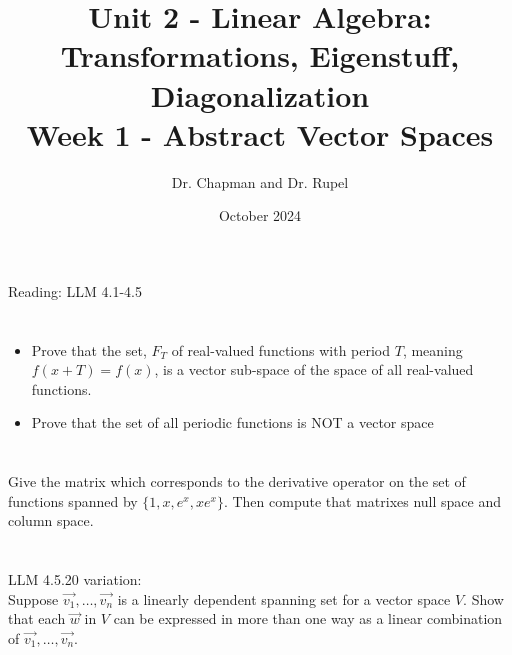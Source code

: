 \documentclass{article}
\title{Unit 2 - Linear Algebra: Transformations, Eigenstuff, Diagonalization \\ Week 1 - Abstract Vector Spaces}
\author{Dr. Chapman and Dr. Rupel}
\date{October 2024}
\begin{document}
\maketitle
Reading: LLM 4.1-4.5\\
\section{}
\begin{itemize}
    \item Prove that the set, $F_T$ of real-valued functions with period $T$, meaning $f(x+T) = f(x)$, is a vector sub-space of the space of all real-valued functions.
    \item Prove that the set of all periodic functions is NOT a vector space
\end{itemize}
\section{}
Give the matrix which corresponds to the derivative operator on the set of functions spanned by $\{1, x, e^x, xe^x\}$. Then compute that matrixes null space and column space.\\
\section{}
LLM 4.5.20 variation:\\
Suppose $\vec{v_1}, \ldots ,\vec{v_n}$ is a linearly dependent spanning set for a vector space $V$. Show that each $\vec{w}$ in $V$ can be expressed in more than one way as a linear combination of $\vec{v_1},\ldots, \vec{v_n}$.
\end{document}
